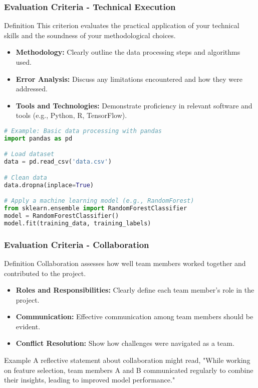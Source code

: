 \documentclass[aspectratio=169]{beamer}
\begin{document}
\begin{frame}[fragile]
    \frametitle{Evaluation Criteria - Technical Execution}
    \begin{block}{Definition}
        This criterion evaluates the practical application of your technical skills and the soundness of your methodological choices.
    \end{block}
    \begin{itemize}
        \item \textbf{Methodology:} Clearly outline the data processing steps and algorithms used.
        \item \textbf{Error Analysis:} Discuss any limitations encountered and how they were addressed.
        \item \textbf{Tools and Technologies:} Demonstrate proficiency in relevant software and tools (e.g., Python, R, TensorFlow).
    \end{itemize}
    \begin{lstlisting}[language=Python, caption=Helpful Code Snippet]
# Example: Basic data processing with pandas
import pandas as pd

# Load dataset
data = pd.read_csv('data.csv')

# Clean data
data.dropna(inplace=True)

# Apply a machine learning model (e.g., RandomForest)
from sklearn.ensemble import RandomForestClassifier
model = RandomForestClassifier()
model.fit(training_data, training_labels)
    \end{lstlisting}
\end{frame}

\begin{frame}
    \frametitle{Evaluation Criteria - Collaboration}
    \begin{block}{Definition}
        Collaboration assesses how well team members worked together and contributed to the project.
    \end{block}
    \begin{itemize}
        \item \textbf{Roles and Responsibilities:} Clearly define each team member's role in the project.
        \item \textbf{Communication:} Effective communication among team members should be evident.
        \item \textbf{Conflict Resolution:} Show how challenges were navigated as a team.
    \end{itemize}
    \begin{block}{Example}
        A reflective statement about collaboration might read, "While working on feature selection, team members A and B communicated regularly to combine their insights, leading to improved model performance."
    \end{block}
\end{frame}
\end{document}
